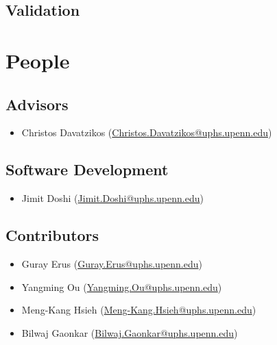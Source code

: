 \documentclass[letterpaper,10pt,english]{sphinxhowto}
\begin{document}
\cite{IPMI2009}

\subsection{Validation}
\label{publications:validation}\cite{WBIR2012}\pagebreak

\section{People}
\label{people::doc}\label{people:people}

\subsection{Advisors}
\label{people:advisors}\begin{itemize}
\item {} 
Christos Davatzikos (\href{mailto:Christos.Davatzikos@uphs.upenn.edu}{Christos.Davatzikos@uphs.upenn.edu})

\end{itemize}


\subsection{Software Development}
\label{people:software-development}\begin{itemize}
\item {} 
Jimit Doshi (\href{mailto:Jimit.Doshi@uphs.upenn.edu}{Jimit.Doshi@uphs.upenn.edu})

\end{itemize}


\subsection{Contributors}
\label{people:contributors}\begin{itemize}
\item {} 
Guray Erus (\href{mailto:Guray.Erus@uphs.upenn.edu}{Guray.Erus@uphs.upenn.edu})

\item {} 
Yangming Ou (\href{mailto:Yangming.Ou@uphs.upenn.edu}{Yangming.Ou@uphs.upenn.edu})

\item {} 
Meng-Kang Hsieh (\href{mailto:Meng-Kang.Hsieh@uphs.upenn.edu}{Meng-Kang.Hsieh@uphs.upenn.edu})

\item {} 
Bilwaj Gaonkar (\href{mailto:Bilwaj.Gaonkar@uphs.upenn.edu}{Bilwaj.Gaonkar@uphs.upenn.edu})

\end{itemize}
\end{document}
